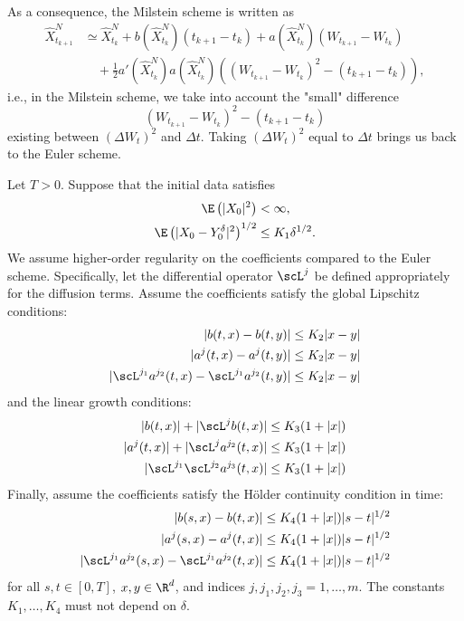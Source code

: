 As a consequence, the Milstein scheme is written as
\begin{align*}
    \hat{X}_{t_{k+1}}^N &\simeq \hat{X}_{t_k}^N + b(\hat{X}_{t_k}^N)(t_{k+1} - t_k) + a(\hat{X}_{t_k}^N)(W_{t_{k+1}} - W_{t_k}) \\
    &\quad + \frac{1}{2} a' (\hat{X}_{t_k}^N)a(\hat{X}_{t_k}^N)((W_{t_{k+1}} - W_{t_k})^2 - (t_{k+1} - t_k)),
\end{align*}
i.e., in the Milstein scheme, we take into account the "small" difference
\begin{equation*}
    (W_{t_{k+1}} - W_{t_k})^2 - (t_{k+1} - t_k)
\end{equation*}
existing between \((\Delta W_t)^2\) and \(\Delta t\). Taking \((\Delta W_t)^2\) equal to \(\Delta t\) brings us back to the Euler scheme.

Let \(T > 0\). Suppose that the initial data satisfies
\begin{align}
    \E \left(|X_0|^2\right) &< \infty, \label{eq:MilsteinInitialMoment} \\
    \E \left(|X_0 - Y^\delta_0|^2\right)^{1/2} &\leq K_1 \delta^{1/2}. \label{eq:MilsteinInitialError}
\end{align}
We assume higher-order regularity on the coefficients compared to the Euler scheme. Specifically, let the differential operator \(\scL^j\) be defined appropriately for the diffusion terms. Assume the coefficients satisfy the global Lipschitz conditions:
\begin{align}
    |b(t, x) - b(t, y)| &\leq K_2 |x - y| \notag \\
    |a^j(t, x) - a^j(t, y)| &\leq K_2 |x - y| \label{eq:MilsteinLipschitz} \\
    |\scL^{j_1} a^{j_2}(t, x) - \scL^{j_1} a^{j_2}(t, y)| &\leq K_2 |x - y| \notag
\end{align}
and the linear growth conditions:
\begin{align}
    |b(t, x)| + |\scL^j b(t, x)| &\leq K_3 (1 + |x|) \notag \\
    |a^j(t, x)| + |\scL^j a^{j_2}(t, x)| &\leq K_3 (1 + |x|) \label{eq:MilsteinLinearGrowth} \\
    |\scL^{j_1} \scL^{j_2} a^{j_3}(t, x)| &\leq K_3 (1 + |x|) \notag
\end{align}
Finally, assume the coefficients satisfy the H\"older continuity condition in time:
\begin{align}
    |b(s, x) - b(t, x)| &\leq K_4 (1 + |x|) |s - t|^{1/2} \notag \\
    |a^j(s, x) - a^j(t, x)| &\leq K_4 (1 + |x|) |s - t|^{1/2} \label{eq:MilsteinHolder} \\
    |\scL^{j_1} a^{j_2}(s, x) - \scL^{j_1} a^{j_2}(t, x)| &\leq K_4 (1 + |x|) |s - t|^{1/2} \notag
\end{align}
for all \(s, t \in [0, T]\), \(x, y \in \R^d\), and indices \(j, j_1, j_2, j_3 = 1, \dots, m\). The constants \(K_1, \dots, K_4\) must not depend on \(\delta\).

